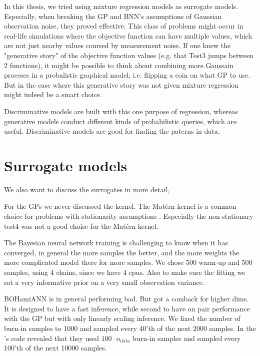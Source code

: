 In this thesis, we tried using mixture regression models as surrogate models. Especially, when
breaking the GP and BNN's assumptions of Gaussian observation noise, they proved effective. This
class of problems might occur in real-life simulations where the objective function can have
multiple values, which are not just nearby values coursed by measurement noise. If one knew the
"generative story" of the objective function values (e.g. that Test3 jumps between 2 functions), it
might be possible to think about combining more Gaussain proceses in a probalistic graphical model,
i.e. flipping a coin on what GP to use. But in the case where this generative story was not given
mixture regression might indeed be a smart choice. 

Discriminative models are built with this one purpose of regression, whereas generative models
conduct different kinds of probabilistic queries, which are useful. Discriminative models are good
for finding the paterns in data.

\section{Surrogate models}
We also want to discuss the surrogates in more detail,

For the GPs we never discussed the kernel. The Matérn kernel is a common choice for problems with
stationarity assumptions \cite{TakeHumanOutOfLoop}. Especially the non-stationary test4 was not a
good choise for the Matérn kernel. 

The Bayesian neural network training is challenging to know when it has converged, in general the
more samples the better, and the more weights the more complicated model there for more samples. We
chose 500 warm-up and 500 samples, using 4 chains, since we have 4 cpus. Also to make sure the
fitting we sat a very informative prior on a very small observation variance. 

BOHamiANN is in general performing bad. But got a comback for higher dims. It is designed to have a
fast inference, while second to have on pair performance with the GP but with only linearly scaling
inference. We fixed the number of burn-in samples to 1000 and sampled every 40'th of
the next 2000 samples. In the \cite{BOHAMIANN}'s code revealed that they used $100\cdot n_{\text{data}}$ burn-in
samples and sampled every 100'th of the next 10000 samples.

